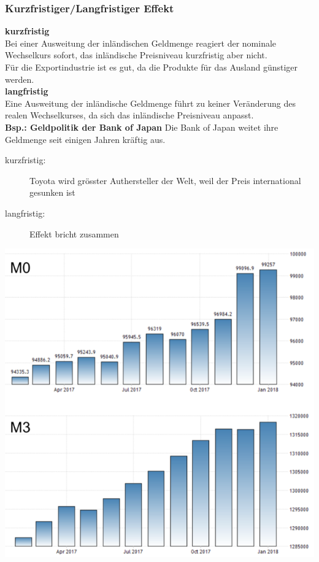 \subsubsection{Kurzfristiger/Langfristiger Effekt}
\begin{multicols}{2}
	\textbf{kurzfristig}\\
	Bei einer Ausweitung der inländischen Geldmenge reagiert der nominale Wechselkurs sofort, das inländische Preisniveau kurzfristig aber nicht.\\
	Für die Exportindustrie ist es gut, da die Produkte für das Ausland günstiger werden.\\
	\vspace{\baselineskip}
	\textbf{langfristig}\\
	Eine Ausweitung der inländische Geldmenge führt zu keiner Veränderung des realen Wechselkurses, da sich das inländische Preisniveau anpasst.\\
	\vspace{\baselineskip}
	\textbf{Bsp.: Geldpolitik der Bank of Japan}
	Die Bank of Japan weitet ihre Geldmenge seit einigen Jahren kräftig aus.\\
	\begin{description}
		\item[kurzfristig:] Toyota wird grösster Authersteller der Welt, weil der Preis international gesunken ist
		\item[langfristig:] Effekt bricht zusammen
	\end{description}
	\vfill\null
	\columnbreak
	\includegraphics[width=0.8\linewidth]{images/bankofjapan.png}
\end{multicols}

